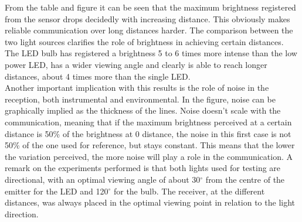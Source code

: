 From the table and figure it can be seen that the maximum brightness registered from the sensor drops decidedly with increasing distance.
This obviously makes reliable communication over long distances harder.
The comparison between the two light sources clarifies the role of brightness in achieving certain distances.
The LED bulb has registered a brightness 5 to 6 times more intense than the low power LED, has a wider viewing angle and clearly is able to reach longer distances, about 4 times more than the single LED.\\
Another important implication with this results is the role of noise in the reception, both instrumental and environmental.
In the figure, noise can be graphically implied as the thickness of the lines.
Noise doesn't scale with the communication, meaning that if the maximum brightness perceived at a certain distance is 50\% of the brightness at 0 distance, the noise in this first case is not 50\% of the one used for reference, but stays constant.
This means that the lower the variation perceived, the more noise will play a role in the communication.
A remark on the experiments performed is that both lights used for testing are directional, with an optimal viewing angle of about 30$^{\circ}$ from the centre of the emitter for the LED and 120$^{\circ}$ for the bulb. 
The receiver, at the different distances, was always placed in the optimal viewing point in relation to the light direction.


